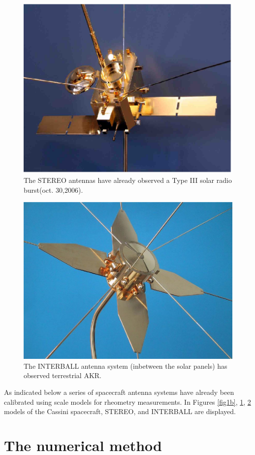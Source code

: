 \documentclass[a4paper,twocolumn]{esapub2005} %
\begin{document}
\begin{figure}
\centering
  \includegraphics[width=0.8\linewidth]{paperpics2/fig1c.eps}
\caption{The STEREO antennas have already observed a Type III solar radio burst(oct. 30,2006).\label{fig1c}}
\end{figure}

\begin{figure}
\centering
  \includegraphics[width=0.8\linewidth]{paperpics2/fig1d.eps}
\caption{The INTERBALL antenna system (inbetween the solar panels) has observed terrestrial AKR.\label{fig1d}}
\end{figure}

As indicated below a series of spacecraft antenna systems have already been calibrated using scale models for rheometry measurements. In Figures \ref{fig1b}, \ref{fig1c}, \ref{fig1d} models of the Cassini spacecraft, STEREO, and INTERBALL are displayed.

\section{The numerical method}
\end{document}
